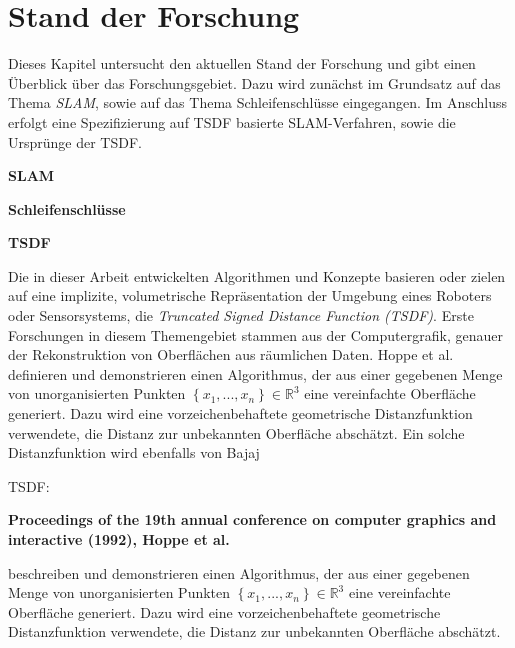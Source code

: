 \chapter{Stand der Forschung}\label{chapter:sdf}

Dieses Kapitel untersucht den aktuellen Stand der Forschung und gibt einen Überblick über das Forschungsgebiet. Dazu wird zunächst im Grundsatz auf das Thema \emph{SLAM}, sowie auf das Thema Schleifenschlüsse eingegangen. Im Anschluss erfolgt eine Spezifizierung auf TSDF basierte SLAM-Verfahren, sowie die Ursprünge der TSDF.

\textbf{SLAM}



\textbf{Schleifenschlüsse}


\textbf{TSDF}

Die in dieser Arbeit entwickelten Algorithmen und Konzepte basieren oder zielen auf eine implizite, volumetrische Repräsentation der Umgebung eines Roboters oder Sensorsystems, die \emph{Truncated Signed Distance Function (TSDF)}. Erste Forschungen in diesem Themengebiet stammen aus der Computergrafik, genauer der Rekonstruktion von Oberflächen aus räumlichen Daten. Hoppe et al. definieren und demonstrieren einen Algorithmus, der aus einer gegebenen Menge von unorganisierten Punkten $\left\lbrace x_1, ..., x_n \right\rbrace \in \mathbb{R}^3$ eine vereinfachte Oberfläche generiert. Dazu wird eine vorzeichenbehaftete geometrische Distanzfunktion verwendete, die Distanz zur unbekannten Oberfläche abschätzt. Ein solche Distanzfunktion wird ebenfalls von Bajaj



TSDF:




\textbf{Proceedings of the 19th annual conference on computer graphics and interactive (1992), Hoppe et al.} \cite{hoppe1992surface}

\begin{description}
\item
beschreiben und demonstrieren einen Algorithmus, der aus einer gegebenen Menge von unorganisierten Punkten $\left\lbrace x_1, ..., x_n \right\rbrace \in \mathbb{R}^3$ eine vereinfachte Oberfläche generiert. Dazu wird eine vorzeichenbehaftete geometrische Distanzfunktion verwendete, die Distanz zur unbekannten Oberfläche abschätzt.
\end{description}

